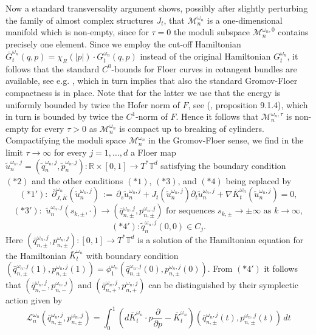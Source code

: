 \documentclass[a4paper,11pt]{amsart}
\newcommand{\RR}{\mathbb{R}}
\newcommand{\TT}{\mathbb{T}}
\begin{document}
\indent Now a standard transversality argument shows, possibly after slightly perturbing the family of almost complex structures $J_t$, that $\mathcal{M}_n^{\omega_n}$ is a one-dimensional manifold which is non-empty, since for $\tau=0$ the moduli subspace $\mathcal{M}_n^{\omega_n,0}$ contains precisely one element. Since we employ the cut-off Hamiltonian $\bar{G}_t^{\omega_n}(q,p)=\chi_R(|p|)\cdot G_t^{\omega_n}(q,p)$ instead of the original Hamiltonian $G_t^{\omega_n}$, it follows that the standard $C^0$-bounds for Floer curves in cotangent bundles are available, see e.g. \cite{C}, which in turn implies that also the standard Gromov-Floer compactness is in place. Note that for the latter we use that the energy is uniformly bounded by twice the Hofer norm of $F$, see (\cite{MDSa}, proposition 9.1.4), which in turn is bounded by twice the $C^1$-norm of $F$. Hence it follows that $\mathcal{M}_n^{\omega_n,\tau}$ is non-empty for every $\tau>0$ as $\mathcal{M}_n^{\omega_n}$ is compact up to breaking of cylinders. Compactifying the moduli space $\mathcal{M}_n^{\omega_n}$ in the Gromov-Floer sense, we find in the limit $\tau\to\infty$ for every $j=1,\ldots,d$ a Floer map $\widetilde{u}^{\omega_n,j}_n=(\widetilde{q}^{\omega_n,j}_n,\widetilde{p}^{\omega_n,j}_n):\RR\times [0,1]\to T^*\TT^d$ satisfying the boundary condition $(*2)$ and the other conditions $(*1)$, $(*3)$, and $(*4)$ being replaced by 
\[(*1'):\,\, \overline{\partial}^{\omega_n}_{J,\bar{K}}(\widetilde{u}^{\omega_n,j}_n)\,:=\,\partial_s\widetilde{u}^{\omega_n,j}_n+J_t(\widetilde{u}^{\omega_n,j}_n)\partial_t\widetilde{u}^{\omega_n,j}_n+\nabla \bar{K}^{\omega_n}_t(\widetilde{u}^{\omega_n,j}_n)=0,\]
\[(*3'):\,\,\widetilde{u}^{\omega_n,j}_n(s_{k,\pm},\cdot)\to(\bar{q}^{\omega_n,j}_{n,\pm},p^{\omega_n,j}_{n,\pm})\,\,\textrm{for sequences}\,\,s_{k,\pm}\to\pm\infty\,\,\textrm{as}\,\,k\to\infty ,\]
\[(*4'): \widetilde{q}^{\omega_n,j}_n(0,0)\in C_j.\]
Here $(\bar{q}^{\omega_n,j}_{n,\pm},p^{\omega_n,j}_{n,\pm}):[0,1]\to T^*\TT^d$ is a solution of the Hamiltonian equation for the Hamiltonian $\bar{K}^{\omega_n}_t$ with boundary condition $(\bar{q}^{\omega_n,j}_{n,\pm}(1),p^{\omega_n,j}_{n,\pm}(1))=\phi^{\omega_n}_1(\bar{q}^{\omega_n,j}_{n,\pm}(0),p^{\omega_n,j}_{n,\pm}(0))$. From $(*4')$ it follows that $(\bar{q}^{\omega_n,j}_{n,-},p^{\omega_n,j}_{n,-})$ and $(\bar{q}^{\omega_n,j}_{n,+},p^{\omega_n,j}_{n,+})$ can be distinguished by their symplectic action given by \[\mathcal{L}_n^{\omega_n}(\bar{q}^{\omega_n,j}_{n,\pm},p^{\omega_n,j}_{n,\pm})=\int_0^1 \left( d\bar{K}^{\omega_n}_t\cdot p\frac{\partial}{\partial p}-\bar{K}^{\omega_n}_t\right)(\bar{q}^{\omega_n,j}_{n,\pm}(t),p^{\omega_n,j}_{n,\pm}(t))\,dt\] 
\end{document}
